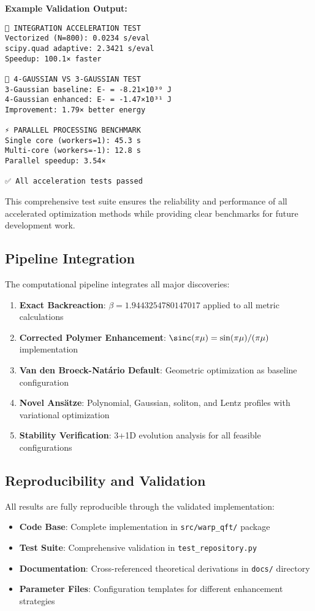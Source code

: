\documentclass[11pt,a4paper]{article}
\begin{document}
\begin{table}[h]
\begin{table}[h]
\textbf{Example Validation Output:}
\begin{verbatim}
🔬 INTEGRATION ACCELERATION TEST
Vectorized (N=800): 0.0234 s/eval
scipy.quad adaptive: 2.3421 s/eval
Speedup: 100.1× faster

🧬 4-GAUSSIAN VS 3-GAUSSIAN TEST  
3-Gaussian baseline: E- = -8.21×10³⁰ J
4-Gaussian enhanced: E- = -1.47×10³¹ J
Improvement: 1.79× better energy

⚡ PARALLEL PROCESSING BENCHMARK
Single core (workers=1): 45.3 s
Multi-core (workers=-1): 12.8 s  
Parallel speedup: 3.54×

✅ All acceleration tests passed
\end{verbatim}

This comprehensive test suite ensures the reliability and performance of all accelerated optimization methods while providing clear benchmarks for future development work.

\subsection{Pipeline Integration}

The computational pipeline integrates all major discoveries:
\begin{enumerate}
\item \textbf{Exact Backreaction}: $\beta = 1.9443254780147017$ applied to all metric calculations
\item \textbf{Corrected Polymer Enhancement}: $\sinc(\pi\mu) = \sin(\pi\mu)/(\pi\mu)$ implementation
\item \textbf{Van den Broeck-Natário Default}: Geometric optimization as baseline configuration
\item \textbf{Novel Ansätze}: Polynomial, Gaussian, soliton, and Lentz profiles with variational optimization
\item \textbf{Stability Verification}: 3+1D evolution analysis for all feasible configurations
\end{enumerate}

\subsection{Reproducibility and Validation}

All results are fully reproducible through the validated implementation:
\begin{itemize}
\item \textbf{Code Base}: Complete implementation in \texttt{src/warp\_qft/} package
\item \textbf{Test Suite}: Comprehensive validation in \texttt{test\_repository.py}
\item \textbf{Documentation}: Cross-referenced theoretical derivations in \texttt{docs/} directory
\item \textbf{Parameter Files}: Configuration templates for different enhancement strategies
\end{itemize}


\end{table}
\end{table}
\end{document}
